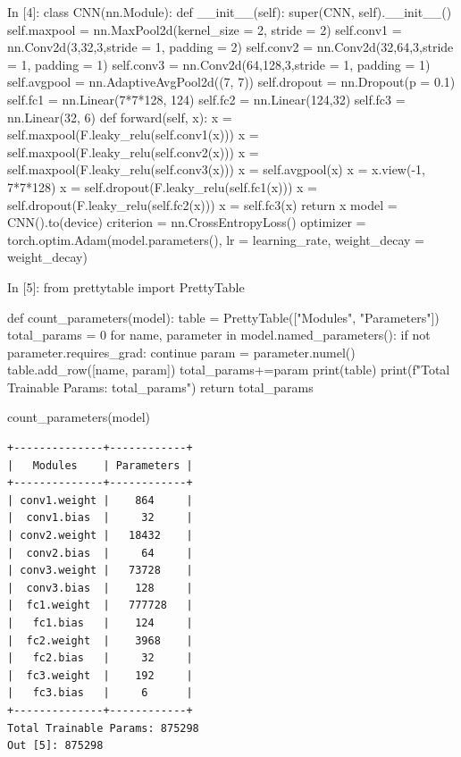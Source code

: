 \documentclass[12pt, a4paper]{article}
\begin{document}
\begin{python}
In [4]: class CNN(nn.Module):
          def __init__(self):
            super(CNN, self).__init__()
            self.maxpool = nn.MaxPool2d(kernel_size = 2, stride = 2)
            self.conv1 = nn.Conv2d(3,32,3,stride = 1, padding = 2)
            self.conv2 = nn.Conv2d(32,64,3,stride = 1, padding = 1)
            self.conv3 = nn.Conv2d(64,128,3,stride = 1, padding = 1)
            self.avgpool = nn.AdaptiveAvgPool2d((7, 7))
            self.dropout = nn.Dropout(p = 0.1)
            self.fc1 = nn.Linear(7*7*128, 124)
            self.fc2 = nn.Linear(124,32)
            self.fc3 = nn.Linear(32, 6) 
          def forward(self, x):
            x = self.maxpool(F.leaky_relu(self.conv1(x)))
            x = self.maxpool(F.leaky_relu(self.conv2(x)))
            x = self.maxpool(F.leaky_relu(self.conv3(x)))
            x = self.avgpool(x)
            x = x.view(-1, 7*7*128)
            x = self.dropout(F.leaky_relu(self.fc1(x)))
            x = self.dropout(F.leaky_relu(self.fc2(x)))
            x = self.fc3(x)
            return x
        model = CNN().to(device)
        criterion = nn.CrossEntropyLoss()
        optimizer = torch.optim.Adam(model.parameters(), lr = learning_rate, weight_decay = weight_decay)
\end{python}
\begin{python}
In [5]: from prettytable import PrettyTable
    
        def count_parameters(model):
            table = PrettyTable(["Modules", "Parameters"])
            total_params = 0
            for name, parameter in model.named_parameters():
                if not parameter.requires_grad: 
                    continue
                param = parameter.numel()
                table.add_row([name, param])
                total_params+=param
            print(table)
            print(f"Total Trainable Params: {total_params}")
            return total_params
        
        count_parameters(model)
\end{python}
\begin{verbatim}
+--------------+------------+
|   Modules    | Parameters |
+--------------+------------+
| conv1.weight |    864     |
|  conv1.bias  |     32     |
| conv2.weight |   18432    |
|  conv2.bias  |     64     |
| conv3.weight |   73728    |
|  conv3.bias  |    128     |
|  fc1.weight  |   777728   |
|   fc1.bias   |    124     |
|  fc2.weight  |    3968    |
|   fc2.bias   |     32     |
|  fc3.weight  |    192     |
|   fc3.bias   |     6      |
+--------------+------------+
Total Trainable Params: 875298
Out [5]: 875298
\end{verbatim}
\end{document}
